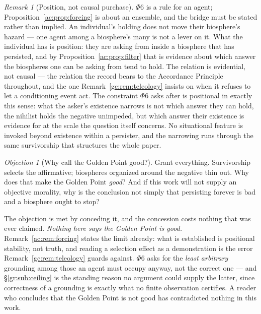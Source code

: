 \documentclass[11pt]{article}
\numberwithin{equation}{section}
\theoremstyle{plain}
\theoremstyle{definition}
\theoremstyle{remark}
\newtheorem{remark}[theorem]{Remark}
\newtheorem{objection}[theorem]{Objection}
\begin{document}
\begin{remark}[Position, not causal purchase]\label{ac:rem:bridge}
$\Phi6$ is a rule for an agent; Proposition~\ref{ac:prop:forcing} is about an ensemble, and the bridge must be stated rather than implied. An individual's holding does not move their biosphere's hazard --- one agent among a biosphere's many is not a lever on it. What the individual has is position: they are asking from inside a biosphere that has persisted, and by Proposition~\ref{ac:prop:filter} that is evidence about which answer the biospheres one can be asking from tend to hold. The relation is evidential, not causal --- the relation the record bears to the Accordance Principle throughout, and the one Remark~\ref{gc:rem:teleology} insists on when it refuses to let a conditioning event act. The constraint $\Phi6$ asks after is positional in exactly this sense: what the asker's existence narrows is not which answer they can hold, the nihilist holds the negative unimpeded, but which answer their existence is evidence for at the scale the question itself concerns. No situational feature is invoked beyond existence within a persister, and the narrowing runs through the same survivorship that structures the whole paper.
\end{remark}

\begin{objection}[Why call the Golden Point good?]\label{ac:obj:good}
Grant everything. Survivorship selects the affirmative; biospheres
organized around the negative thin out. Why does that make the Golden
Point \emph{good}? And if this work will not supply an objective
morality, why is the conclusion not simply that persisting forever is bad
and a biosphere ought to stop?
\end{objection}

\noindent The objection is met by conceding it, and the concession costs
nothing that was ever claimed. \emph{Nothing here says the Golden Point is good.}
Remark~\ref{ac:rem:forcing} states the limit already: what is
established is positional stability, not truth, and reading a selection
effect as a demonstration is the error Remark~\ref{gc:rem:teleology} guards
against. $\Phi6$ asks for the \emph{least arbitrary} grounding among
those an agent must occupy anyway, not the correct one --- and
\S\ref{gr:sub:ceiling} is the standing reason no argument could supply
the latter, since correctness of a grounding is exactly what no finite
observation certifies. A reader who concludes that the Golden Point is
not good has contradicted nothing in this work.
\end{document}
